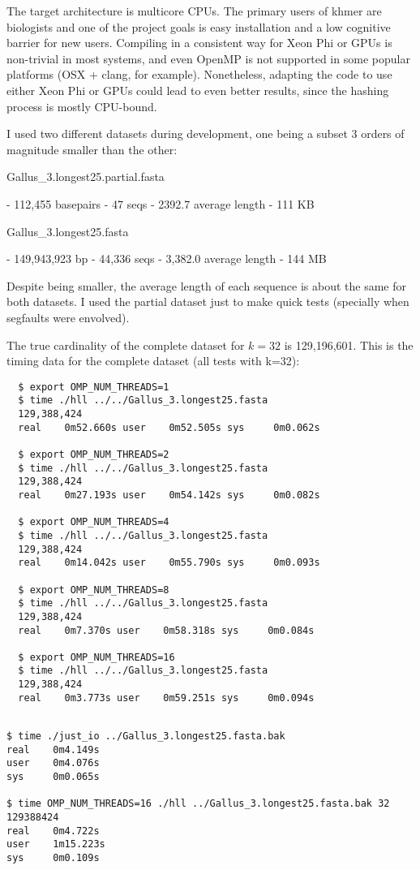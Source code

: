 \documentclass{bioinfo}
\begin{document}
The target architecture is multicore CPUs.
The primary users of khmer are biologists and one of the project goals is easy installation and a low cognitive barrier for new users.
Compiling in a consistent way for Xeon Phi or GPUs is non-trivial in most systems,
and even OpenMP is not supported in some popular platforms (OSX + clang, for example).
Nonetheless,
adapting the code to use either Xeon Phi or GPUs could lead to even better results,
since the hashing process is mostly CPU-bound.

I used two different datasets during development,
one being a subset 3 orders of magnitude smaller than the other:

Gallus\_3.longest25.partial.fasta

  - 112,455 basepairs
  - 47 seqs
  - 2392.7 average length
  - 111 KB

Gallus\_3.longest25.fasta

  - 149,943,923 bp
  - 44,336 seqs
  - 3,382.0 average length
  - 144 MB

Despite being smaller,
the average length of each sequence is about the same for both datasets.
I used the partial dataset just to make quick tests
(specially when segfaults were envolved).

The true cardinality of the complete dataset for $k=32$ is 129,196,601.
This is the timing data for the complete dataset (all tests with k=32):

\begin{verbatim}
  $ export OMP_NUM_THREADS=1
  $ time ./hll ../../Gallus_3.longest25.fasta
  129,388,424
  real    0m52.660s user    0m52.505s sys     0m0.062s

  $ export OMP_NUM_THREADS=2
  $ time ./hll ../../Gallus_3.longest25.fasta
  129,388,424
  real    0m27.193s user    0m54.142s sys     0m0.082s

  $ export OMP_NUM_THREADS=4
  $ time ./hll ../../Gallus_3.longest25.fasta
  129,388,424
  real    0m14.042s user    0m55.790s sys     0m0.093s

  $ export OMP_NUM_THREADS=8
  $ time ./hll ../../Gallus_3.longest25.fasta
  129,388,424
  real    0m7.370s user    0m58.318s sys     0m0.084s

  $ export OMP_NUM_THREADS=16
  $ time ./hll ../../Gallus_3.longest25.fasta
  129,388,424
  real    0m3.773s user    0m59.251s sys     0m0.094s
\end{verbatim}

\begin{verbatim}

$ time ./just_io ../Gallus_3.longest25.fasta.bak
real    0m4.149s
user    0m4.076s
sys     0m0.065s

$ time OMP_NUM_THREADS=16 ./hll ../Gallus_3.longest25.fasta.bak 32
129388424
real    0m4.722s
user    1m15.223s
sys     0m0.109s

\end{verbatim}
\end{document}
